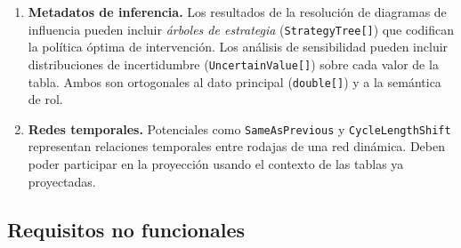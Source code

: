 \documentclass[11pt,a4paper]{article}
\newcommand{\code}[1]{\texttt{#1}}
\begin{document}
\begin{enumerate}[label=\textbf{RF\arabic*}]
  \item \textbf{Metadatos de inferencia.}
        Los resultados de la resolución de diagramas de influencia pueden
        incluir \emph{árboles de estrategia} (\code{StrategyTree[]}) que
        codifican la política óptima de intervención.  Los análisis de
        sensibilidad pueden incluir distribuciones de incertidumbre
        (\code{UncertainValue[]}) sobre cada valor de la tabla.  Ambos
        son ortogonales al dato principal (\code{double[]}) y a la
        semántica de rol.
        \label{req:rf6}

  \item \textbf{Redes temporales.}
        Potenciales como \code{SameAsPrevious} y \code{CycleLengthShift}
        representan relaciones temporales entre rodajas de una red dinámica.
        Deben poder participar en la proyección usando el contexto de las
        tablas ya proyectadas.
        \label{req:rf7}
\end{enumerate}

\subsection{Requisitos no funcionales}
\end{document}
